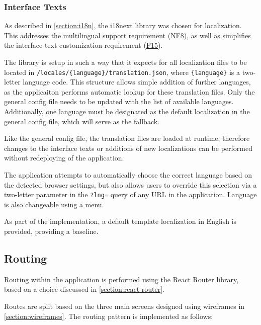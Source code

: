 \subsubsection{Interface Texts} \label{section:impl-languages}

As described in \autoref{section:i18n}, the i18next library was chosen for localization. This addresses the multilingual support requirement (\hyperref[itm:NF8]{NF8}), as well as simplifies the interface text customization requirement (\hyperref[itm:F15]{F15}).

The library is setup in such a way that it expects for all localization files to be located in \texttt{/locales/\{language\}/translation.json}, where \texttt{\{language\}} is a two-letter language code. This structure allows simple addition of further languages, as the applicaiton performs automatic lookup for these translation files. Only the general config file needs to be updated with the list of available languages. Additionally, one language must be designated as the default localization in the general config file, which will serve as the fallback.

Like the general config file, the translation files are loaded at runtime, therefore changes to the interface texts or additions of new localizations can be performed without redeploying of the application.

The application attempts to automatically choose the correct language based on the detected browser settings, but also allows users to override this selection via a two-letter parameter in the \texttt{?lng=} query of any URL in the application. Language is also changeable using a menu.

As part of the implementation, a default template localization in English is provided, providing a baseline.


\subsection{Routing}

Routing within the application is performed using the React Router library, based on a choice discussed in \autoref{section:react-router}.

Routes are split based on the three main screens designed using wireframes in \autoref{section:wireframes}. The routing pattern is implemented as follows:

